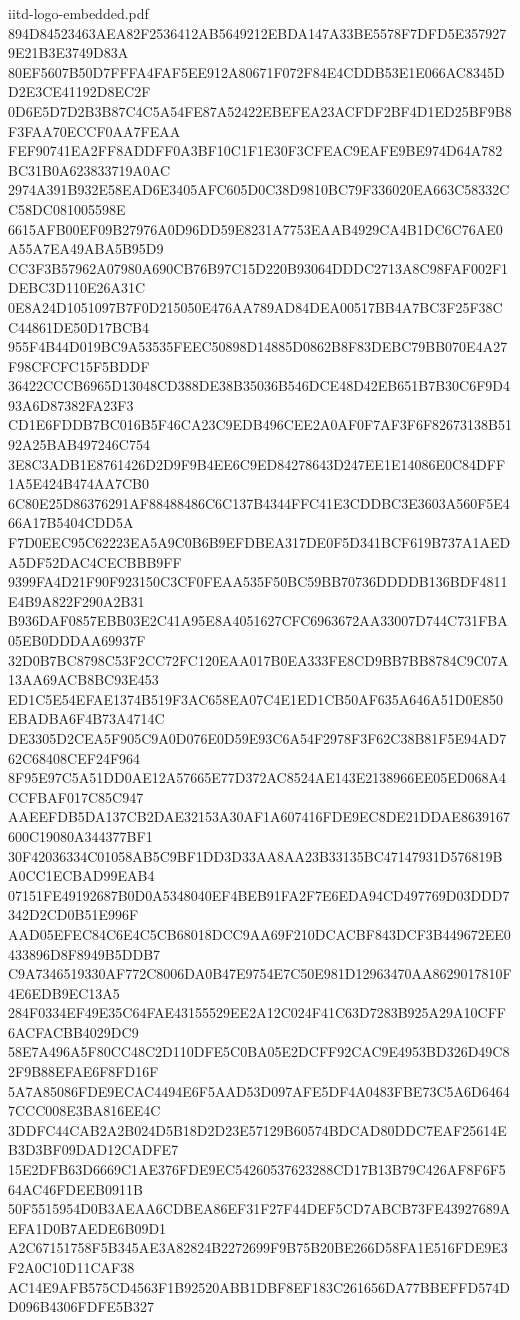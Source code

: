 \begin{filecontents*}[overwrite]{iitd-logo-embedded.pdf}
894D84523463AEA82F2536412AB5649212EBDA147A33BE5578F7DFD5E3579279E21B3E3749D83A
80EF5607B50D7FFFA4FAF5EE912A80671F072F84E4CDDB53E1E066AC8345DD2E3CE41192D8EC2F
0D6E5D7D2B3B87C4C5A54FE87A52422EBEFEA23ACFDF2BF4D1ED25BF9B8F3FAA70ECCF0AA7FEAA
FEF90741EA2FF8ADDFF0A3BF10C1F1E30F3CFEAC9EAFE9BE974D64A782BC31B0A623833719A0AC
2974A391B932E58EAD6E3405AFC605D0C38D9810BC79F336020EA663C58332CC58DC081005598E
6615AFB00EF09B27976A0D96DD59E8231A7753EAAB4929CA4B1DC6C76AE0A55A7EA49ABA5B95D9
CC3F3B57962A07980A690CB76B97C15D220B93064DDDC2713A8C98FAF002F1DEBC3D110E26A31C
0E8A24D1051097B7F0D215050E476AA789AD84DEA00517BB4A7BC3F25F38CC44861DE50D17BCB4
955F4B44D019BC9A53535FEEC50898D14885D0862B8F83DEBC79BB070E4A27F98CFCFC15F5BDDF
36422CCCB6965D13048CD388DE38B35036B546DCE48D42EB651B7B30C6F9D493A6D87382FA23F3
CD1E6FDDB7BC016B5F46CA23C9EDB496CEE2A0AF0F7AF3F6F82673138B5192A25BAB497246C754
3E8C3ADB1E8761426D2D9F9B4EE6C9ED84278643D247EE1E14086E0C84DFF1A5E424B474AA7CB0
6C80E25D86376291AF88488486C6C137B4344FFC41E3CDDBC3E3603A560F5E466A17B5404CDD5A
F7D0EEC95C62223EA5A9C0B6B9EFDBEA317DE0F5D341BCF619B737A1AEDA5DF52DAC4CECBBB9FF
9399FA4D21F90F923150C3CF0FEAA535F50BC59BB70736DDDDB136BDF4811E4B9A822F290A2B31
B936DAF0857EBB03E2C41A95E8A4051627CFC6963672AA33007D744C731FBA05EB0DDDAA69937F
32D0B7BC8798C53F2CC72FC120EAA017B0EA333FE8CD9BB7BB8784C9C07A13AA69ACB8BC93E453
ED1C5E54EFAE1374B519F3AC658EA07C4E1ED1CB50AF635A646A51D0E850EBADBA6F4B73A4714C
DE3305D2CEA5F905C9A0D076E0D59E93C6A54F2978F3F62C38B81F5E94AD762C68408CEF24F964
8F95E97C5A51DD0AE12A57665E77D372AC8524AE143E2138966EE05ED068A4CCFBAF017C85C947
AAEEFDB5DA137CB2DAE32153A30AF1A607416FDE9EC8DE21DDAE8639167600C19080A344377BF1
30F42036334C01058AB5C9BF1DD3D33AA8AA23B33135BC47147931D576819BA0CC1ECBAD99EAB4
07151FE49192687B0D0A5348040EF4BEB91FA2F7E6EDA94CD497769D03DDD7342D2CD0B51E996F
AAD05EFEC84C6E4C5CB68018DCC9AA69F210DCACBF843DCF3B449672EE0433896D8F8949B5DDB7
C9A7346519330AF772C8006DA0B47E9754E7C50E981D12963470AA8629017810F4E6EDB9EC13A5
284F0334EF49E35C64FAE43155529EE2A12C024F41C63D7283B925A29A10CFF6ACFACBB4029DC9
58E7A496A5F80CC48C2D110DFE5C0BA05E2DCFF92CAC9E4953BD326D49C82F9B88EFAE6F8FD16F
5A7A85086FDE9ECAC4494E6F5AAD53D097AFE5DF4A0483FBE73C5A6D64647CCC008E3BA816EE4C
3DDFC44CAB2A2B024D5B18D2D23E57129B60574BDCAD80DDC7EAF25614EB3D3BF09DAD12CADFE7
15E2DFB63D6669C1AE376FDE9EC54260537623288CD17B13B79C426AF8F6F564AC46FDEEB0911B
50F5515954D0B3AEAA6CDBEA86EF31F27F44DEF5CD7ABCB73FE43927689AEFA1D0B7AEDE6B09D1
A2C67151758F5B345AE3A82824B2272699F9B75B20BE266D58FA1E516FDE9E3F2A0C10D11CAF38
AC14E9AFB575CD4563F1B92520ABB1DBF8EF183C261656DA77BBEFFD574DD096B4306FDFE5B327

\end{filecontents*}
